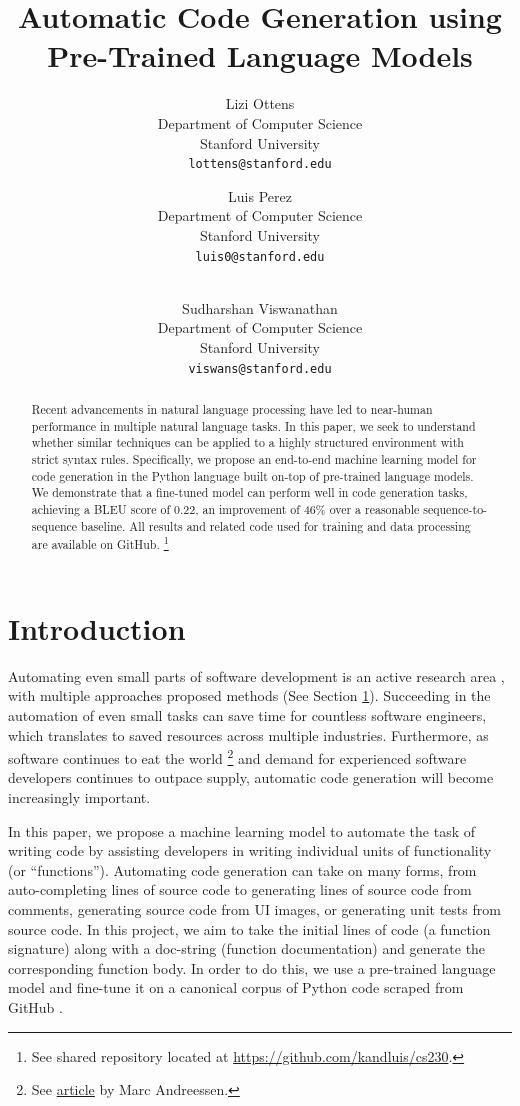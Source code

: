 \documentclass[10pt,twocolumn]{article}
\title{Automatic Code Generation using Pre-Trained Language Models}
\author{
  Lizi Ottens  \\
  Department of Computer Science\\
  Stanford University\\
  \texttt{lottens@stanford.edu}
  
  \and
  
  Luis Perez \\
  Department of Computer Science \\
  Stanford University \\
  \texttt{luis0@stanford.edu}
  
  \and
  
  \\
  Sudharshan Viswanathan \\
  Department of Computer Science \\
  Stanford University \\
  \texttt{viswans@stanford.edu}
}
\begin{document}
\maketitle

\begin{abstract}
 Recent advancements in natural language processing \cite{gpt2} \cite{BERT} have led to near-human performance in multiple natural language tasks. In this paper, we seek to understand whether similar techniques can be applied to a highly structured environment with strict syntax rules. Specifically, we propose an end-to-end machine learning model for code generation in the Python language built on-top of pre-trained language models. We demonstrate that a fine-tuned model can perform  well in code generation tasks, achieving a BLEU score of 0.22, an improvement of 46\% over a reasonable sequence-to-sequence baseline. All results and related code used for training and data processing are available on GitHub. \footnote{See shared repository located at \href{https://github.com/kandluis/cs230}{https://github.com/kandluis/cs230}.}
\end{abstract}

\section{Introduction}
\label{sec:introduction}
Automating even small parts of software development is an active research area \cite{survey}, with multiple approaches proposed  methods (See Section \ref{sec:introduction}). Succeeding in the automation of even small tasks can save time for countless software engineers, which translates to saved resources across multiple industries. Furthermore, as software continues to eat the world \footnote{See \href{https://www.wsj.com/articles/SB10001424053111903480904576512250915629460}{article} by Marc Andreessen.} and demand for experienced software developers continues to outpace supply, automatic code generation will become increasingly important.

In this paper, we propose a machine learning model to automate the task of writing code by assisting developers in writing individual units of functionality (or ``functions''). Automating code generation can take on many forms, from auto-completing lines of source code to generating lines of source code from comments, generating source code from UI images, or generating unit tests from source code. In this project, we aim to take the initial lines of code (a function signature) along with a doc-string (function documentation) and generate the corresponding function body. In order to do this, we use a pre-trained language model and fine-tune it on a canonical corpus of Python code scraped from GitHub \cite{codesearchnet}.
\end{document}
